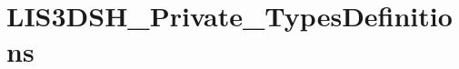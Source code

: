 \hypertarget{group__LIS3DSH__Private__TypesDefinitions}{\section{L\-I\-S3\-D\-S\-H\-\_\-\-Private\-\_\-\-Types\-Definitions}
\label{group__LIS3DSH__Private__TypesDefinitions}
}
